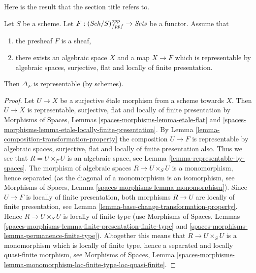 \noindent
Here is the result that the section title refers to.

\begin{lemma}
\label{lemma-bootstrap-diagonal}
Let $S$ be a scheme.
Let $F : (\mathit{Sch}/S)_{fppf}^{opp} \to \textit{Sets}$ be a functor.
Assume that
\begin{enumerate}
\item the presheaf $F$ is a sheaf,
\item there exists an algebraic space $X$ and a map $X \to F$
which is representable by algebraic spaces, surjective, flat and
locally of finite presentation.
\end{enumerate}
Then $\Delta_F$ is representable (by schemes).
\end{lemma}

\begin{proof}
Let $U \to X$ be a surjective \'etale morphism from a scheme towards $X$.
Then $U \to X$ is representable, surjective, flat and
locally of finite presentation by
Morphisms of Spaces,
Lemmas \ref{spaces-morphisms-lemma-etale-flat} and
\ref{spaces-morphisms-lemma-etale-locally-finite-presentation}.
By
Lemma \ref{lemma-composition-transformation-property}
the composition $U \to F$ is representable by algebraic spaces,
surjective, flat and locally of finite presentation also.
Thus we see that $R = U \times_F U$ is an algebraic space, see
Lemma \ref{lemma-representable-by-spaces}.
The morphism of algebraic spaces $R \to U \times_S U$ is
a monomorphism, hence separated (as the diagonal of a monomorphism
is an isomorphism, see
Morphisms of Spaces,
Lemma \ref{spaces-morphisms-lemma-monomorphism}).
Since $U \to F$ is locally of finite presentation, both
morphisms $R \to U$ are locally of finite presentation, see
Lemma \ref{lemma-base-change-transformation-property}.
Hence $R \to U \times_S U$ is locally of finite type (use
Morphisms of Spaces,
Lemmas \ref{spaces-morphisms-lemma-finite-presentation-finite-type} and
\ref{spaces-morphisms-lemma-permanence-finite-type}).
Altogether this means that
$R \to U \times_S U$ is a monomorphism which is locally of finite
type, hence a separated and locally quasi-finite morphism, see
Morphisms of Spaces, Lemma
\ref{spaces-morphisms-lemma-monomorphism-loc-finite-type-loc-quasi-finite}.


\end{proof}
